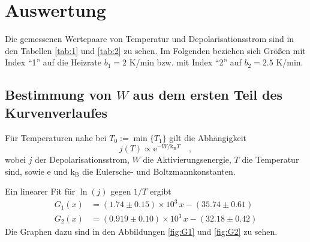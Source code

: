 \section{Auswertung}
Die gemessenen Wertepaare von Temperatur und Depolarisationsstrom sind in den 
Tabellen \ref{tab:1} und \ref{tab:2} zu sehen. Im Folgenden beziehen sich Größen mit
Index "`1"' auf die Heizrate $b_1=2$ K/min bzw. mit Index "`2"' auf $b_2=2.5$ 
K/min.

%
%
%
%
\subsection{Bestimmung von $W$ aus dem ersten Teil des Kurvenverlaufes}
Für Temperaturen nahe bei $T_0:=\min\{T_1\}$ gilt die Abhängigkeit
\begin{equation}
j(T)\propto \text{e}^{-W/\text{k}_\text{B}T} \quad ,
\end{equation}
wobei $j$ der Depolarisationsstrom, $W$ die Aktivierungsenergie, $T$ die 
Temperatur sind, sowie $\text{e}$ und $\text{k}_\text{B}$ die Eulersche- und 
Boltzmannkonstanten.

Ein linearer Fit für $\ln(j)$ gegen $1/T$ ergibt
%
%
\begin{align}
G_1(x)&= ( 1.74\pm 0.15)\times 10^{3} \,x - (35.74 \pm 0.61) \\
G_2(x)&= (0.919 \pm 0.10 )\times 10^{3} \,x - (32.18 \pm 0.42)
\end{align}
Die Graphen dazu sind in den Abbildungen \ref{fig:G1} und \ref{fig:G2} zu sehen.

